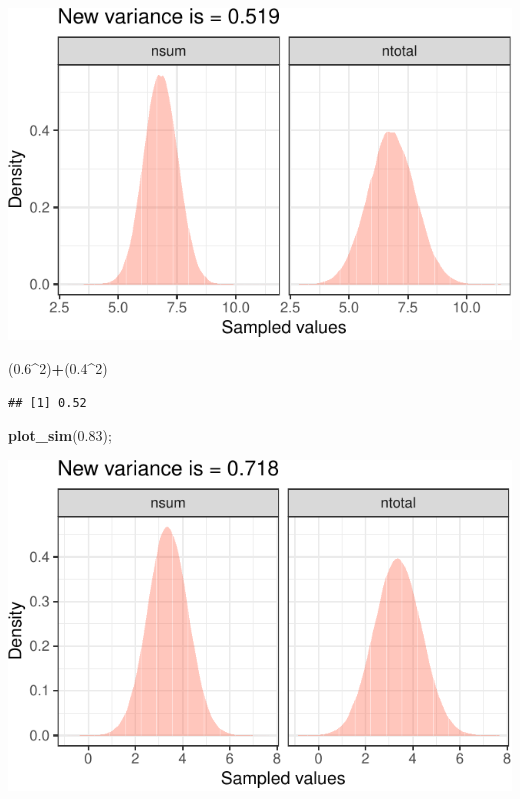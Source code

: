 \documentclass[]{article}
\newenvironment{Shaded}{\begin{snugshade}}{\end{snugshade}}
\newcommand{\DecValTok}[1]{\textcolor[rgb]{0.00,0.00,0.81}{#1}}
\newcommand{\FloatTok}[1]{\textcolor[rgb]{0.00,0.00,0.81}{#1}}
\newcommand{\KeywordTok}[1]{\textcolor[rgb]{0.13,0.29,0.53}{\textbf{#1}}}
\newcommand{\NormalTok}[1]{#1}
\newcommand{\OperatorTok}[1]{\textcolor[rgb]{0.81,0.36,0.00}{\textbf{#1}}}
\begin{document}
\begin{center}\includegraphics{exercises_files/figure-latex/unnamed-chunk-9-1} \end{center}

\begin{Shaded}
\begin{Highlighting}[]
\NormalTok{(}\FloatTok{0.6}\OperatorTok{^}\DecValTok{2}\NormalTok{)}\OperatorTok{+}\NormalTok{(}\FloatTok{0.4}\OperatorTok{^}\DecValTok{2}\NormalTok{)}
\end{Highlighting}
\end{Shaded}

\begin{verbatim}
## [1] 0.52
\end{verbatim}

\begin{Shaded}
\begin{Highlighting}[]
\KeywordTok{plot_sim}\NormalTok{(}\FloatTok{0.83}\NormalTok{);}
\end{Highlighting}
\end{Shaded}

\begin{center}\includegraphics{exercises_files/figure-latex/unnamed-chunk-9-2} \end{center}
\end{document}
